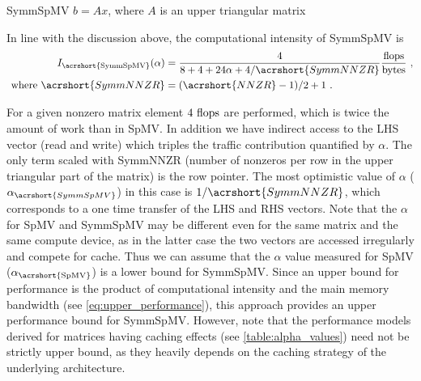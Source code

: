 \begin{algorithm}[tbp]
	\caption{SymmSpMV $b=Ax$, where $A$ is an upper triangular matrix} 
	\label{alg:SymmSpMV}
	\begin{algorithmic}[1]
			\ENDFOR
		\ENDFOR
	\end{algorithmic}
\end{algorithm}
In line with the discussion above, the computational intensity of \acrshort{SymmSpMV} is
\begin{align}
\label{eq:SymmSpMV_intensity}
I_\mathrm{\acrshort{SymmSpMV}} (\alpha) &= \frac{4}{8+4+24\alpha+4/\acrshort{SymmNNZR}} \frac{\FLOP}{\BYTE}\cma\\
\label{eq:NNZR_symm}
\text{ where  } \acrshort{SymmNNZR} &= (\acrshort{NNZR}-1)/2 + 1\eos
\end{align}

For a given nonzero matrix element $4~\mbox{flops}$ are performed, which is
twice the amount of work than in \acrshort{SpMV}. In addition we have
indirect access to the LHS vector (read and write) which triples the
traffic contribution quantified by $\alpha$\@. The only term scaled
with \acrshort{SymmNNZR} (number of nonzeros per row in the upper
triangular part of the matrix) is the row pointer. The most optimistic
value of $\alpha$ ($\alpha_{\acrshort{SymmSpMV}}$) in this case is
$1/{\acrshort{SymmNNZR}}$, which corresponds to a one time transfer of
the LHS and RHS vectors.  Note that the $\alpha$ for \acrshort{SpMV}
and \acrshort{SymmSpMV} may be different even for the same matrix and
the same compute device, as in the latter case the two vectors are
accessed irregularly and compete for cache. Thus we
can assume that the $\alpha$ value measured for \acrshort{SpMV}
($\alpha_\mathrm{\acrshort{SpMV}}$) is a lower bound
for \acrshort{SymmSpMV}.  Since an upper bound for performance is the
product of computational intensity and the main memory bandwidth
(see \cref{eq:upper_performance}), this approach provides an upper
performance bound for \acrshort{SymmSpMV}.  However, note that the
performance models derived for matrices having caching effects
(see \cref{table:alpha_values}) need not be strictly upper bound, as
they heavily depends on the caching strategy of the underlying
architecture.
\begin{comment}
 for a given matrix structure:
 \begin{align}
\label{eq:SymmSpMV_performance}
P^{max}_\mathrm{\acrshort{SymmSpMV}}  &= I_\mathrm{\acrshort{SymmSpMV}} (\alpha_\mathrm{\acrshort{SpMV}})  \times b_S
\end{align}
As most matrices have a considerable number of nonzeros per row, we chose $b_S$ to be the optimistic (load-only) value  from~\cref{tab:test_bed}.
\end{comment}

